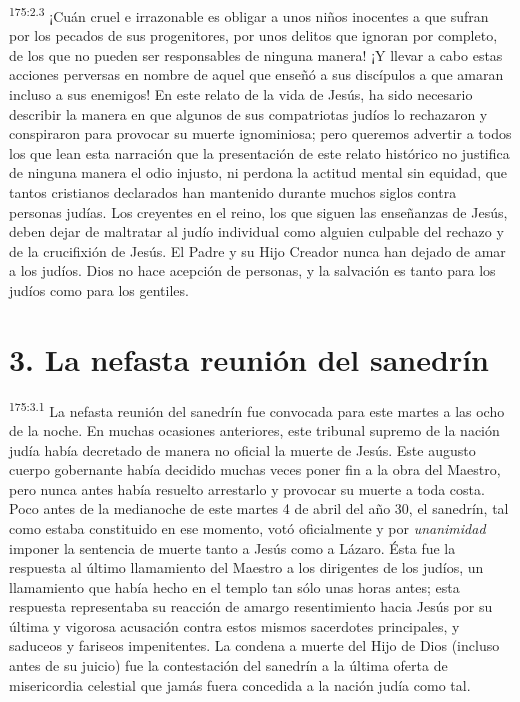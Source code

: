 \par 
\textsuperscript{175:2.3} ¡Cuán cruel e irrazonable es obligar a unos niños inocentes a que sufran por los pecados de sus progenitores, por unos delitos que ignoran por completo, de los que no pueden ser responsables de ninguna manera! ¡Y llevar a cabo estas acciones perversas en nombre de aquel que enseñó a sus discípulos a que amaran incluso a sus enemigos! En este relato de la vida de Jesús, ha sido necesario describir la manera en que algunos de sus compatriotas judíos lo rechazaron y conspiraron para provocar su muerte ignominiosa; pero queremos advertir a todos los que lean esta narración que la presentación de este relato histórico no justifica de ninguna manera el odio injusto, ni perdona la actitud mental sin equidad, que tantos cristianos declarados han mantenido durante muchos siglos contra personas judías. Los creyentes en el reino, los que siguen las enseñanzas de Jesús, deben dejar de maltratar al judío individual como alguien culpable del rechazo y de la crucifixión de Jesús. El Padre y su Hijo Creador nunca han dejado de amar a los judíos. Dios no hace acepción de personas, y la salvación es tanto para los judíos como para los gentiles.

\section*{3. La nefasta reunión del sanedrín}
\par 
\textsuperscript{175:3.1} La nefasta reunión del sanedrín fue convocada para este martes a las ocho de la noche. En muchas ocasiones anteriores, este tribunal supremo de la nación judía había decretado de manera no oficial la muerte de Jesús. Este augusto cuerpo gobernante había decidido muchas veces poner fin a la obra del Maestro, pero nunca antes había resuelto arrestarlo y provocar su muerte a toda costa. Poco antes de la medianoche de este martes 4 de abril del año 30, el sanedrín, tal como estaba constituido en ese momento, votó oficialmente y por \textit{unanimidad} imponer la sentencia de muerte tanto a Jesús como a Lázaro. Ésta fue la respuesta al último llamamiento del Maestro a los dirigentes de los judíos, un llamamiento que había hecho en el templo tan sólo unas horas antes; esta respuesta representaba su reacción de amargo resentimiento hacia Jesús por su última y vigorosa acusación contra estos mismos sacerdotes principales, y saduceos y fariseos impenitentes. La condena a muerte del Hijo de Dios (incluso antes de su juicio) fue la contestación del sanedrín a la última oferta de misericordia celestial que jamás fuera concedida a la nación judía como tal.

